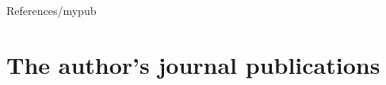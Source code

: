 % 

\begin{btSect}{References/mypub}
\section{The author's journal publications}
\btPrintAll
\end{btSect}
